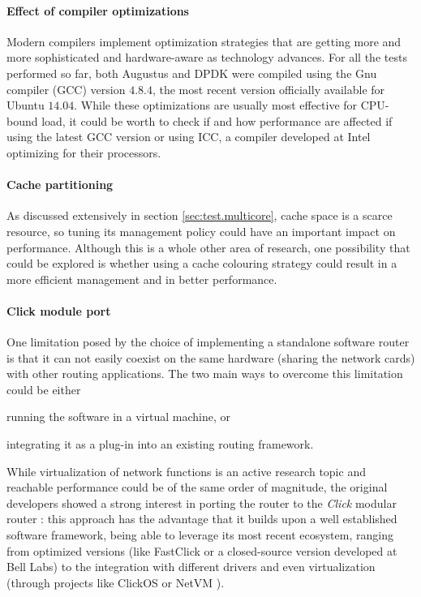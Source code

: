 \documentclass[11pt,a4paper,twoside,titlepage,openany]{book}
\begin{document}
\paragraph{Effect of compiler optimizations} Modern compilers implement optimization strategies that are getting more and more sophisticated and hardware-aware as technology advances. For all the tests performed so far, both Augustus and DPDK were compiled using the Gnu compiler (GCC) version $4.8.4$, the most recent version officially available for Ubuntu $14.04$. While these optimizations are usually most effective for CPU-bound load, it could be worth to check if and how performance are affected if using the latest GCC version or using ICC, a compiler developed at Intel optimizing for their processors.

\paragraph{Cache partitioning} As discussed extensively in section \ref{sec:test.multicore}, cache space is a scarce resource, so tuning its management policy could have an important impact on performance. Although this is a whole other area of research, one possibility that could be explored is whether using a cache colouring strategy could result in a more efficient management and in better performance.



\paragraph{Click module port}


One limitation posed by the choice of implementing a standalone software router is that it can not easily coexist on the same hardware (sharing the network cards) with other routing applications. The two main ways to overcome this limitation could be either \begin{inlineenum} \item running the software in a virtual machine, or \item integrating it as a plug-in into an existing routing framework. \end{inlineenum}
While virtualization of network functions is an active research topic and reachable performance could be of the same order of magnitude, the original developers showed a strong interest in porting the router to the \emph{Click} modular router \cite{click}: this approach has the advantage that it builds upon a well established software framework, being able to leverage its most recent ecosystem, ranging from optimized versions (like FastClick \cite{fastclick} or a closed-source version developed at Bell Labs) to the integration with different drivers and even virtualization (through projects like ClickOS \cite{clickos} or NetVM \cite{netvm}).
\end{document}
